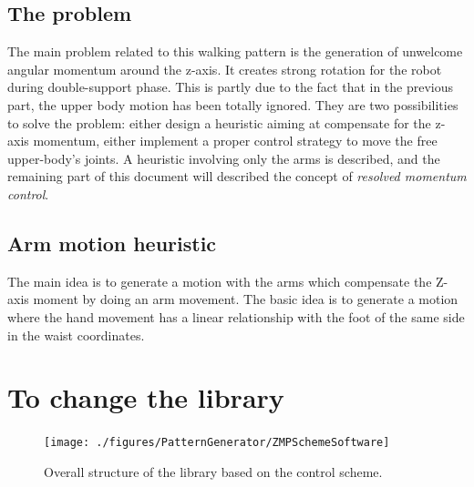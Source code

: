 \subsection{The problem}

The main problem related to this walking pattern is the generation of
unwelcome angular momentum around the z-axis. It creates strong rotation
for the robot during double-support phase. This is partly due to the fact that
in the previous part, the upper body motion has been totally ignored.
They are two possibilities to solve the problem: either design a heuristic
aiming at compensate for the z-axis momentum, either implement a proper
control strategy to move the free upper-body's joints.
A heuristic involving only the arms is described, and the remaining part
of this document will described the concept of \textit{resolved momentum control}.

\subsection{Arm motion heuristic}

The main idea is to generate a motion with the arms which compensate the Z-axis moment
by doing an arm movement. The basic idea is to generate a motion where the hand movement
has a linear relationship with the foot of the same side in the waist coordinates.




\section{To change the library}

\begin{figure}[htb]
\begin{center}
\texttt{[image: ./figures/PatternGenerator/ZMPSchemeSoftware]}
\caption{Overall structure of the library based on the control scheme.}
\label{pic:OverallStructure}
\end{center}
\end{figure}

